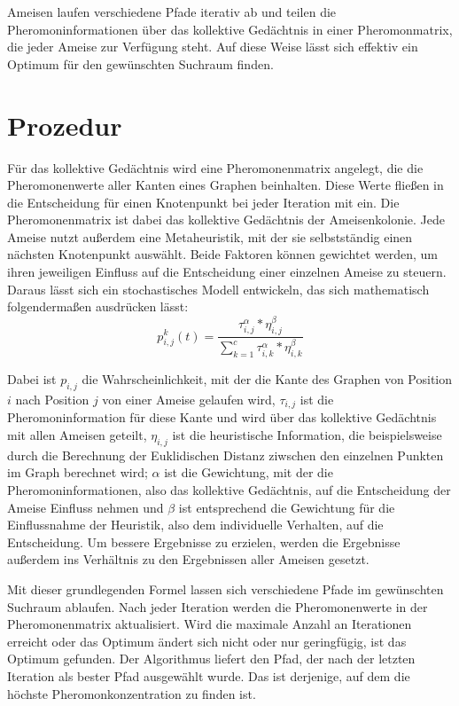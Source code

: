 Ameisen laufen verschiedene Pfade iterativ ab und teilen die
Pheromoninformationen über das kollektive Gedächtnis in einer Pheromonmatrix,
die jeder Ameise zur Verfügung steht. Auf diese Weise lässt sich effektiv
ein Optimum für den gewünschten Suchraum finden.

\section{Prozedur}
\label{sec:prozedur}

Für das kollektive Gedächtnis wird eine Pheromonenmatrix angelegt, die die
Pheromonenwerte aller Kanten eines Graphen beinhalten. Diese Werte fließen
in die Entscheidung für einen Knotenpunkt bei jeder Iteration mit ein. Die
Pheromonenmatrix ist dabei das kollektive Gedächtnis der Ameisenkolonie.
Jede Ameise nutzt außerdem eine Metaheuristik, mit der sie selbstständig einen
nächsten Knotenpunkt auswählt. Beide Faktoren können gewichtet werden, um
ihren jeweiligen Einfluss auf die Entscheidung einer einzelnen Ameise zu
steuern.
Daraus lässt sich ein stochastisches Modell entwickeln, das sich mathematisch
folgendermaßen ausdrücken lässt:
\begin{equation}
    p_{i,j}^k(t) = \frac{\tau_{i,j}^\alpha * \eta_{i,j}^\beta}{
        \sum_{k=1}^c \tau_{i,k}^\alpha * \eta_{i,k}^\beta
    }
\end{equation}

Dabei ist $p_{i,j}$ die Wahrscheinlichkeit, mit der die Kante des Graphen
von Position $i$ nach Position $j$ von einer Ameise gelaufen wird,
$\tau_{i,j}$ ist die Pheromoninformation für diese Kante und wird über das
kollektive Gedächtnis mit allen Ameisen geteilt, $\eta_{i,j}$ ist die
heuristische Information, die beispielsweise durch die Berechnung der
Euklidischen Distanz ziwschen den einzelnen Punkten im Graph berechnet wird;
$\alpha$ ist die Gewichtung, mit der die Pheromoninformationen, also das
kollektive Gedächtnis, auf die Entscheidung der Ameise Einfluss nehmen und
$\beta$ ist entsprechend die Gewichtung für die Einflussnahme der Heuristik,
also dem individuelle Verhalten, auf die Entscheidung.
Um bessere Ergebnisse zu erzielen, werden die Ergebnisse außerdem ins
Verhältnis zu den Ergebnissen aller Ameisen gesetzt. 

Mit dieser grundlegenden Formel lassen sich verschiedene Pfade im
gewünschten Suchraum ablaufen.
Nach jeder Iteration werden die Pheromonenwerte in der Pheromonenmatrix
aktualisiert. Wird die maximale Anzahl an Iterationen erreicht oder das
Optimum ändert sich nicht oder nur geringfügig, ist das Optimum gefunden.
Der Algorithmus liefert den Pfad, der nach der letzten Iteration als
bester Pfad ausgewählt wurde. Das ist derjenige, auf dem die höchste
Pheromonkonzentration zu finden ist.

